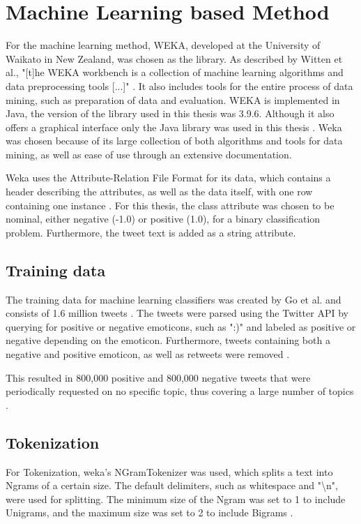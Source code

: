 \section{Machine Learning based Method}

For the machine learning method, WEKA, developed at the University of Waikato in New Zealand, was chosen as the library. As described by Witten et al., "[t]he WEKA workbench is a collection of machine learning algorithms and data preprocessing tools [...]" \cite[p.~7]{weka}. It also includes tools for the entire process of data mining, such as preparation of data and evaluation. WEKA is implemented in Java, the version of the library used in this thesis was 3.9.6. Although it also offers a graphical interface only the Java library was used in this thesis \cite{weka}. Weka was chosen because of its large collection of both algorithms and tools for data mining, as well as ease of use through an extensive documentation.

Weka uses the Attribute-Relation File Format for its data, which contains a header describing the attributes, as well as the data itself, with one row containing one instance \cite{weka}. For this thesis, the class attribute was chosen to be nominal, either negative (-1.0) or positive (1.0), for a binary classification problem. Furthermore, the tweet text is added as a string attribute.

\subsection{Training data}
The training data for machine learning classifiers was created by Go et al. and consists of 1.6 million tweets \cite{GoBHaHua2009}. The tweets were parsed using the Twitter API by querying for positive or negative emoticons, such as ":)" and labeled as positive or negative depending on the emoticon. Furthermore, tweets containing both a negative and positive emoticon, as well as retweets were removed \cite{GoBHaHua2009}.

This resulted in 800,000 positive and 800,000 negative tweets that were periodically requested on no specific topic, thus covering a large number of topics \cite{GoBHaHua2009}.

\subsection{Tokenization}
For Tokenization, weka's NGramTokenizer was used, which splits a text into Ngrams of a certain size. The default delimiters, such as whitespace and "\textbackslash n", were used for splitting. The minimum size of the Ngram was set to 1 to include Unigrams, and the maximum size was set to 2 to include Bigrams \cite{weka}.
